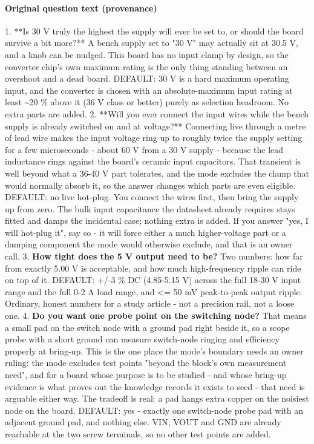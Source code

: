 \documentclass[11pt,a4paper]{article}
\begin{document}
\paragraph*{Original question text (provenance)}
1. {*}{*}Is 30 V truly the highest the supply will ever be set to, or should the board survive a bit more?{*}{*} A bench supply set to "30 V" may actually sit at 30.5 V, and a knob can be nudged. This board has no input clamp by design, so the converter chip's own maximum rating is the only thing standing between an overshoot and a dead board. DEFAULT: 30 V is a hard maximum operating input, and the converter is chosen with an absolute-maximum input rating at least \textasciitilde{}20 \% above it (36 V class or better) purely as selection headroom. No extra parts are added. 2. {*}{*}Will you ever connect the input wires while the bench supply is already switched on and at voltage?{*}{*} Connecting live through a metre of lead wire makes the input voltage ring up to roughly twice the supply setting for a few microseconds - about 60 V from a 30 V supply - because the lead inductance rings against the board's ceramic input capacitors. That transient is well beyond what a 36-40 V part tolerates, and the mode excludes the clamp that would normally absorb it, so the answer changes which parts are even eligible. DEFAULT: no live hot-plug. You connect the wires first, then bring the supply up from zero. The bulk input capacitance the datasheet already requires stays fitted and damps the incidental case; nothing extra is added. If you answer "yes, I will hot-plug it", say so - it will force either a much higher-voltage part or a damping component the mode would otherwise exclude, and that is an owner call. 3. \textbf{How tight does the 5 V output need to be?} Two numbers: how far from exactly 5.00 V is acceptable, and how much high-frequency ripple can ride on top of it. DEFAULT: +/-3 \% DC (4.85-5.15 V) across the full 18-30 V input range and the full 0-2 A load range, and \textless{}= 50 mV peak-to-peak output ripple. Ordinary, honest numbers for a study article - not a precision rail, not a loose one. 4. \textbf{Do you want one probe point on the switching node?} That means a small pad on the switch node with a ground pad right beside it, so a scope probe with a short ground can measure switch-node ringing and efficiency properly at bring-up. This is the one place the mode's boundary needs an owner ruling: the mode excludes test points "beyond the block's own measurement need", and for a board whose purpose is to be studied - and whose bring-up evidence is what proves out the knowledge records it exists to seed - that need is arguable either way. The tradeoff is real: a pad hangs extra copper on the noisiest node on the board. DEFAULT: yes - exactly one switch-node probe pad with an adjacent ground pad, and nothing else. VIN, VOUT and GND are already reachable at the two screw terminals, so no other test points are added.
\end{document}
